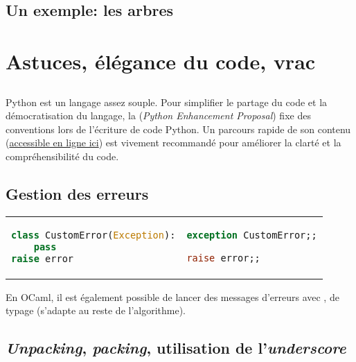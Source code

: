\documentclass{hibiscus}
\begin{document}
\newpage \subsection{Un exemple: les arbres}




\newpage \section{Astuces, élégance du code, vrac}

\subsection{}

\par Python est un langage assez souple. Pour simplifier le partage du code et la démocratisation du langage, la  (\textit{Python Enhancement Proposal}) fixe des conventions lors de l'écriture de code Python. Un parcours rapide de son contenu (\href{https://www.python.org/dev/peps/pep-0008/}{accessible en ligne ici}) est vivement recommandé pour améliorer la clarté et la compréhensibilité du code.

\subsection{Gestion des erreurs}

\begin{tabular}{p{} p{}}
\begin{lstlisting}[language=Python]
class CustomError(Exception):
    pass
raise error
\end{lstlisting}
&
\begin{lstlisting}[language=Caml]
exception CustomError;;

raise error;;
\end{lstlisting}
\end{tabular}

\par En OCaml, il est également possible de lancer des messages d'erreurs avec , de typage  (s'adapte au reste de l'algorithme).

\subsection{\textit{Unpacking}, \textit{packing}, utilisation de l'\textit{underscore}}
\end{document}
